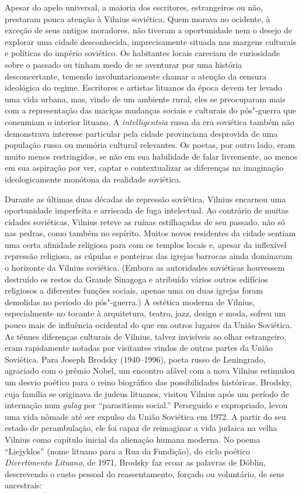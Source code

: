 Apesar do apelo universal, a maioria dos escritores, estrangeiros ou
não, prestaram pouca atenção à Vilnius soviética. Quem morava no
ocidente, à exceção de seus antigos moradores, não tiveram a
oportunidade nem o desejo de explorar uma cidade desconhecida,
imprecisamente situada nas margens culturais e políticas do império
soviético. Os habitantes locais careciam de curiosidade sobre o passado
ou tinham medo de se aventurar por uma história desconcertante, temendo
involuntariamente chamar a atenção da censura ideológica do regime.
Escritores e artistas lituanos da época devem ter levado uma vida
urbana, mas, vindo de um ambiente rural, eles se preocuparam mais com a
representação das maciças mudanças sociais e culturais do pós"-guerra que
consumiam o interior lituano. A \textit{intelligentsia} russa da era
soviética também não demonstrava interesse particular pela cidade
provinciana desprovida de uma população russa ou memória cultural
relevantes. Os poetas, por outro lado, eram muito menos restringidos, se
não em sua habilidade de falar livremente, ao menos em sua aspiração por
ver, captar e contextualizar as diferenças na imaginação ideologicamente
monótona da realidade soviética.

Durante as últimas duas décadas de repressão soviética, Vilnius encarnou
uma oportunidade imperfeita e arriscada de fuga intelectual. Ao
contrário de muitas cidades soviéticas, Vilnius reteve as ruínas
estilhaçadas de seu passado, não só nas pedras, como também no espírito.
Muitos novos residentes da cidade sentiam uma certa afinidade religiosa
para com os templos locais e, apesar da inflexível repressão religiosa,
as cúpulas e ponteiras das igrejas barrocas ainda dominavam o horizonte
da Vilnius soviética. (Embora as autoridades soviéticas houvessem
destruído os restos da Grande Sinagoga e atribuído vários outros
edifícios religiosos a diferentes funções sociais, apenas uma ou duas
igrejas foram demolidas no período do pós"-guerra.) A estética moderna de
Vilnius, especialmente no tocante à arquitetura, teatro, jazz, design e
moda, sofreu um pouco mais de influência ocidental do que em outros
lugares da União Soviética. As tênues diferenças culturais de Vilnius,
talvez invisíveis ao olhar estrangeiro, eram rapidamente notadas por
visitantes vindos de outras partes da União Soviética. Para Joseph
Brodsky (1940--1996), poeta russo de Leningrado, agraciado com o prêmio
Nobel, um encontro afável com a nova Vilnius estimulou um desvio poético
para o reino biográfico das possibilidades históricas. Brodsky, cuja
família se originava de judeus lituanos, visitou Vilnius após um período
de internação num \textit{gulag} por ``parasitismo social.'' Perseguido e
expropriado, levou uma vida nômade até ser expulso da União Soviética em
1972. A partir do seu estado de perambulação, ele foi capaz de
reimaginar a vida judaica na velha Vilnius como capítulo inicial da
alienação humana moderna. No poema ``Liejyklos'' (nome lituano para a
Rua da Fundição), do ciclo poético \textit{Divertimento Lituano}, de 1971,
Brodsky faz ecoar as palavras de Döblin, descrevendo o custo pessoal do
reassentamento, forçado ou voluntário, de seus ancestrais:

